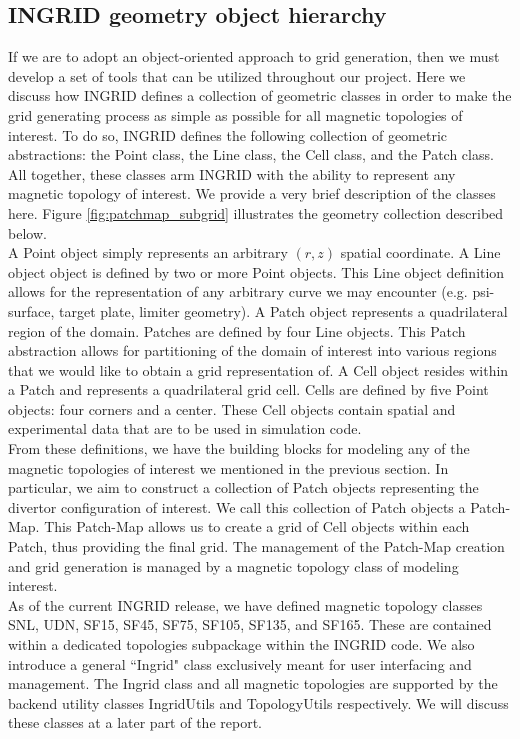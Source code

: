 \subsection{\label{sec:label2}INGRID geometry object hierarchy}
If we are to adopt an object-oriented approach to grid generation, then we must develop a set of tools that can be utilized throughout our project. Here we discuss how INGRID defines a collection of geometric classes in order to make the grid generating process as simple as possible for all magnetic topologies of interest. To do so, INGRID defines the following collection of geometric abstractions: the Point class, the Line class, the Cell class, and the Patch class. All together, these classes arm INGRID with the ability to represent any magnetic topology of interest. We provide a very brief description of the classes here. Figure \ref{fig:patchmap_subgrid} illustrates the geometry collection described below.\\
\indent
A Point object simply represents an arbitrary $(r,z)$ spatial coordinate. A Line object object is defined by two or more Point objects. This Line object definition allows for the representation of any arbitrary curve we may encounter (e.g. psi-surface, target plate, limiter geometry). A Patch object represents a quadrilateral region of the domain. Patches are defined by four Line objects. This Patch abstraction allows for partitioning of the domain of interest into various regions that we would like to obtain a grid representation of. A Cell object resides within a Patch and represents a quadrilateral grid cell. Cells are defined by five Point objects: four corners and a center. These Cell objects contain spatial and experimental data that are to be used in simulation code.\\ \indent
From these definitions, we have the building blocks for modeling any of the magnetic topologies of interest we mentioned in the previous section. In particular, we aim to construct a collection of Patch objects representing the divertor configuration of interest. We call this collection of Patch objects a Patch-Map. This Patch-Map allows us to create a grid of Cell objects within each Patch, thus providing the final grid. The management of the Patch-Map creation and grid generation is managed by a magnetic topology class of modeling interest. \\ \indent
As of the current INGRID release, we have defined magnetic topology classes SNL, UDN, SF15, SF45, SF75, SF105, SF135, and SF165. These are contained within a dedicated topologies subpackage within the INGRID code. We also introduce a general ``Ingrid" class exclusively meant for user interfacing and management. The Ingrid class and all magnetic topologies are supported by the backend utility classes IngridUtils and TopologyUtils respectively. We will discuss these classes at a later part of the report.
